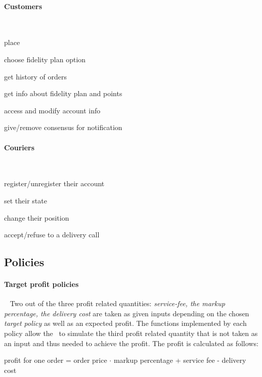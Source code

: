 \paragraph*{Customers}~\vspace{0.3\baselineskip}
\begin{itemize}
  \begin{minipage}{0.47\linewidth}
    \item place \Order
    \item choose fidelity plan option
    \item get history of orders
  \end{minipage}
  \begin{minipage}{0.53\linewidth}
    \item get info about fidelity plan and points
    \item access and modify account info
    \item give/remove consensus for notification
  \end{minipage}
\end{itemize}

\paragraph*{Couriers}~\vspace{0.3\baselineskip}
\begin{itemize}
  \begin{minipage}{0.47\linewidth}
    \item register/unregister their account
    \item set their state
  \end{minipage}
  \begin{minipage}{0.53\linewidth}
    \item change their position
    \item accept/refuse to a delivery call
  \end{minipage}
\end{itemize}


\subsection{Policies} %
\label{sub:policies}
\paragraph{Target profit policies}~\vspace{0.3\baselineskip}
Two out of the three profit related quantities: \emph{service-fee,
the markup percentage, the delivery cost}
are taken as given inputs depending on the chosen \emph{target policy} as well as an expected profit.
The functions implemented by each policy allow the \Manager~to simulate the third 
profit related quantity that is not taken as an input and thus 
needed to achieve the profit. The profit is calculated as follows: 
\begin{center} 
  profit for one order = order price $\cdot$ markup percentage + service fee - delivery cost
\end{center}

